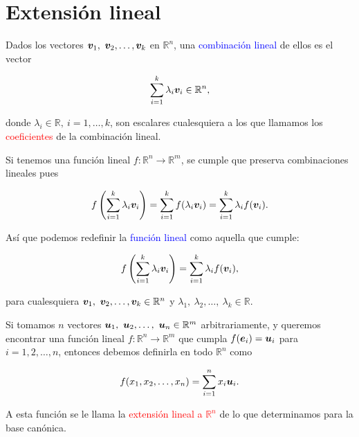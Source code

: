 \documentclass{article}
\theoremstyle{definicion}
\theoremstyle{definition}             %
\theoremstyle{definition}             %
\theoremstyle{definition}
\theoremstyle{definition}
\theoremstyle{observacion}
\theoremstyle{definition}
\theoremstyle{plain}
\theoremstyle{definition}
\theoremstyle{afirmacion}
\theoremstyle{definition}
\begin{document}
    \section{Extensión lineal}

    Dados los vectores \(\vb*{v}_{1},\ \vb*{v}_{2}, \dots, \vb*{v}_{k}\) en \(\mathbb{R}^{n}\), una \textcolor{blue}{combinación lineal} de ellos es el vector

    \begin{equation*}
        \sum_{i = 1}^{k} \lambda_{i} \vb*{v}_{i}\in\mathbb{R}^{n},
    \end{equation*}

    donde \(\lambda_{i}\in\mathbb{R},\ i = 1, \dots, k\), son escalares cualesquiera a los que llamamos los \textcolor{red}{coeficientes} de la combinación lineal.

    Si tenemos una función lineal \(f \colon \mathbb{R}^{n} \to \mathbb{R}^{m}\), se cumple que preserva combinaciones lineales pues

    \begin{equation*}
        f\left(\sum_{i = 1}^{k} \lambda_{i} \vb*{v}_{i}\right) = \sum_{i = 1}^{k} f(\lambda_{i} \vb*{v}_{i}) = \sum_{i = 1}^{k} \lambda_{i} f(\vb*{v}_{i}).
    \end{equation*}
    
    Así que podemos redefinir la \textcolor{blue}{función lineal} como aquella que cumple:
    
    \begin{equation*}
        f\left(\sum_{i = 1}^{k} \lambda_{i} \vb*{v}_{i}\right) = \sum_{i = 1}^{k} \lambda_{i} f(\vb*{v}_{i}),
    \end{equation*}

    para cualesquiera \(\vb*{v}_{1},\ \vb*{v}_{2}, \dots, \vb*{v}_{k}\in\mathbb{R}^{n}\) y \(\lambda_{1},\ \lambda_{2}, \dots,\ \lambda_{k}\in\mathbb{R}\).

    Si tomamos \(n\) vectores \(\vb*{u}_{1},\ \vb*{u}_{2}, \dots,\ \vb*{u}_{n} \in \mathbb{R}^{m}\) arbitrariamente, y queremos encontrar una función lineal \(f \colon \mathbb{R}^{n} \to \mathbb{R}^{m}\) que cumpla \(f(\vb*{e}_{i}) = \vb*{u}_{i}\) para \(i = 1, 2, \dots, n\), entonces debemos definirla en todo \(\mathbb{R}^{n}\) como

    \begin{equation*}
        f(x_{1}, x_{2}, \dots, x_{n}) = \sum_{i = 1}^{n} x_{i} \vb*{u}_{i}.
    \end{equation*}

    A esta función se le llama la \textcolor{red}{extensión lineal a \(\mathbb{R}^{n}\)} de lo que determinamos para la base canónica.
\end{document}

